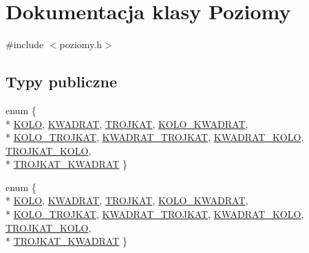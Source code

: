 \hypertarget{classPoziomy}{\section{Dokumentacja klasy Poziomy}
\label{classPoziomy}
}


{\ttfamily \#include $<$poziomy.\-h$>$}

\subsection*{Typy publiczne}
\begin{DoxyCompactItemize}
\item 
enum \{ \\*
\hyperlink{classPoziomy_afc13fed3fe34dbde1fa8323ca7563baea98b177f62525aaa6740a841b9307d684}{K\-O\-L\-O}, 
\hyperlink{classPoziomy_afc13fed3fe34dbde1fa8323ca7563baea691b30487e8a683cef80dd9196b9d868}{K\-W\-A\-D\-R\-A\-T}, 
\hyperlink{classPoziomy_afc13fed3fe34dbde1fa8323ca7563baeaac0c94fa8e5e04f750aa3285eba37be0}{T\-R\-O\-J\-K\-A\-T}, 
\hyperlink{classPoziomy_afc13fed3fe34dbde1fa8323ca7563baea401b10db62af9dc2e1d8f7b4f0858173}{K\-O\-L\-O\-\_\-\-K\-W\-A\-D\-R\-A\-T}, 
\\*
\hyperlink{classPoziomy_afc13fed3fe34dbde1fa8323ca7563baea3e1519272495b90b0ad0ad07f617dce5}{K\-O\-L\-O\-\_\-\-T\-R\-O\-J\-K\-A\-T}, 
\hyperlink{classPoziomy_afc13fed3fe34dbde1fa8323ca7563baeaadec9c72835621187a256f8e77c9174e}{K\-W\-A\-D\-R\-A\-T\-\_\-\-T\-R\-O\-J\-K\-A\-T}, 
\hyperlink{classPoziomy_afc13fed3fe34dbde1fa8323ca7563baea83db2f995adc12d02fb0e861966c6ec1}{K\-W\-A\-D\-R\-A\-T\-\_\-\-K\-O\-L\-O}, 
\hyperlink{classPoziomy_afc13fed3fe34dbde1fa8323ca7563baeaea86aaefc1176f59691d0756f496a89d}{T\-R\-O\-J\-K\-A\-T\-\_\-\-K\-O\-L\-O}, 
\\*
\hyperlink{classPoziomy_afc13fed3fe34dbde1fa8323ca7563baea61885b03833f887ac6759b697b326ffe}{T\-R\-O\-J\-K\-A\-T\-\_\-\-K\-W\-A\-D\-R\-A\-T}
 \}
\item 
enum \{ \\*
\hyperlink{classPoziomy_afc13fed3fe34dbde1fa8323ca7563baea98b177f62525aaa6740a841b9307d684}{K\-O\-L\-O}, 
\hyperlink{classPoziomy_afc13fed3fe34dbde1fa8323ca7563baea691b30487e8a683cef80dd9196b9d868}{K\-W\-A\-D\-R\-A\-T}, 
\hyperlink{classPoziomy_afc13fed3fe34dbde1fa8323ca7563baeaac0c94fa8e5e04f750aa3285eba37be0}{T\-R\-O\-J\-K\-A\-T}, 
\hyperlink{classPoziomy_afc13fed3fe34dbde1fa8323ca7563baea401b10db62af9dc2e1d8f7b4f0858173}{K\-O\-L\-O\-\_\-\-K\-W\-A\-D\-R\-A\-T}, 
\\*
\hyperlink{classPoziomy_afc13fed3fe34dbde1fa8323ca7563baea3e1519272495b90b0ad0ad07f617dce5}{K\-O\-L\-O\-\_\-\-T\-R\-O\-J\-K\-A\-T}, 
\hyperlink{classPoziomy_afc13fed3fe34dbde1fa8323ca7563baeaadec9c72835621187a256f8e77c9174e}{K\-W\-A\-D\-R\-A\-T\-\_\-\-T\-R\-O\-J\-K\-A\-T}, 
\hyperlink{classPoziomy_afc13fed3fe34dbde1fa8323ca7563baea83db2f995adc12d02fb0e861966c6ec1}{K\-W\-A\-D\-R\-A\-T\-\_\-\-K\-O\-L\-O}, 
\hyperlink{classPoziomy_afc13fed3fe34dbde1fa8323ca7563baeaea86aaefc1176f59691d0756f496a89d}{T\-R\-O\-J\-K\-A\-T\-\_\-\-K\-O\-L\-O}, 
\\*
\hyperlink{classPoziomy_afc13fed3fe34dbde1fa8323ca7563baea61885b03833f887ac6759b697b326ffe}{T\-R\-O\-J\-K\-A\-T\-\_\-\-K\-W\-A\-D\-R\-A\-T}
 \}
\end{DoxyCompactItemize}
